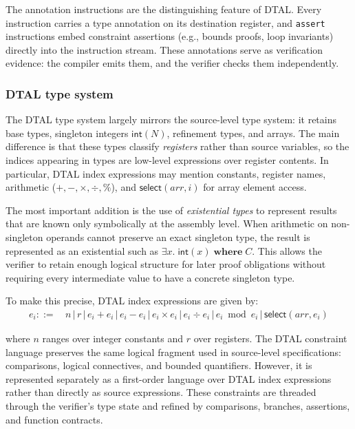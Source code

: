 \noindent The annotation instructions are the distinguishing feature of DTAL. Every instruction carries a type annotation on its destination register, and \texttt{assert} instructions embed constraint assertions (e.g., bounds proofs, loop invariants) directly into the instruction stream. These annotations serve as verification evidence: the compiler emits them, and the verifier checks them independently.

\subsubsection{DTAL type system}

The DTAL type system largely mirrors the source-level type system: it retains base types, singleton integers $\textsf{int}(N)$, refinement types, and arrays. The main difference is that these types classify \emph{registers} rather than source variables, so the indices appearing in types are low-level expressions over register contents. In particular, DTAL index expressions may mention constants, register names, arithmetic ($+, -, \times, \div, \%$), and $\textsf{select}(\mathit{arr}, i)$ for array element access.

The most important addition is the use of \textit{existential types} to represent results that are known only symbolically at the assembly level. When arithmetic on non-singleton operands cannot preserve an exact singleton type, the result is represented as an existential such as $\exists x.\; \textsf{int}(x) \;\mathbf{where}\; C$. This allows the verifier to retain enough logical structure for later proof obligations without requiring every intermediate value to have a concrete singleton type.

To make this precise, DTAL index expressions are given by:
\[
\begin{aligned}
  e_i ::=\, & n \,|\, r \,|\, e_i + e_i \,|\, e_i - e_i \,|\, e_i \times e_i \,|\, e_i \div e_i \,|\, e_i \bmod e_i \,|\, \textsf{select}(\mathit{arr}, e_i)
\end{aligned}
\]

\noindent where $n$ ranges over integer constants and $r$ over registers. The DTAL constraint language preserves the same logical fragment used in source-level specifications: comparisons, logical connectives, and bounded quantifiers. However, it is represented separately as a first-order language over DTAL index expressions rather than directly as source expressions. These constraints are threaded through the verifier's type state and refined by comparisons, branches, assertions, and function contracts.

